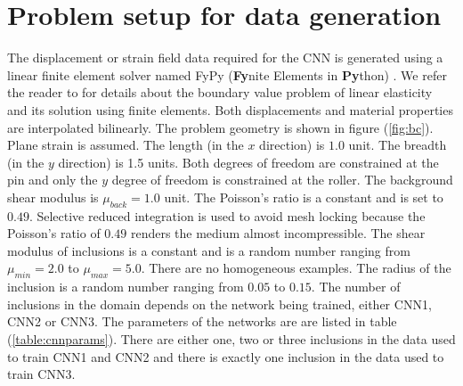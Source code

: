 \documentclass[12pt]{article}
\begin{document}
\section{\label{sect:probsetup}Problem setup for data generation}
The displacement or strain field data required for the CNN is generated using a linear finite element solver named FyPy (\textbf{Fy}nite Elements in \textbf{Py}thon) \cite{misc:fypy}. We refer the reader to \cite{book:hugheslinear,book:fishbelytschko,book:segelmathcont} for details about the boundary value problem of linear elasticity and its solution using finite elements. Both displacements and material properties are interpolated bilinearly. The problem geometry is shown in figure (\ref{fig:bc}). Plane strain is assumed. The length (in the $x$ direction) is $1.0$ unit. The breadth (in the $y$ direction) is 1.5 units. Both degrees of freedom are constrained at the pin and only the $y$ degree of freedom is constrained at the roller. The background shear modulus is $\mu_{back}=1.0$ unit. The Poisson's ratio is a constant and is set to $0.49$. Selective reduced integration is used to avoid mesh locking because the Poisson's ratio of $0.49$ renders the medium almost incompressible. The shear modulus of inclusions is a constant and is a random number ranging from $\mu_{min}=2.0$ to $\mu_{max}=5.0$. There are no homogeneous examples. The radius of the inclusion is a random number ranging from $0.05$ to $0.15$. The number of inclusions in the domain depends on the network being trained, either CNN1, CNN2 or CNN3. The parameters of the networks are are listed in table (\ref{table:cnnparams}). There are either one, two or three inclusions in the data used to train CNN1 and CNN2 and there is exactly one inclusion in the data used to train CNN3.
\end{document}
